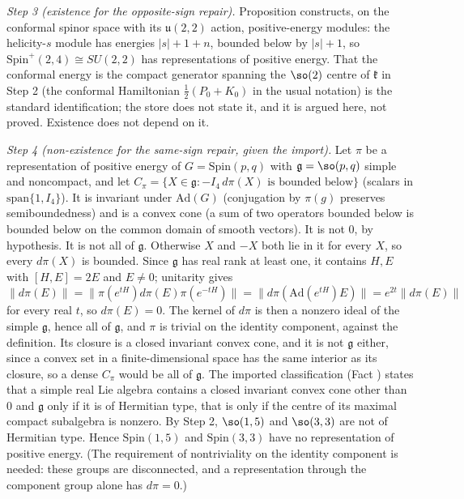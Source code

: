 \emph{Step 3 (existence for the opposite-sign repair).} Proposition  constructs, on the conformal spinor space with its $\mathfrak{u}(2,2)$ action, positive-energy modules: the helicity-$s$ module has energies $|s| + 1 + n$, bounded below by $|s| + 1$, so $\mathrm{Spin}^{+}(2,4) \cong SU(2,2)$ has representations of positive energy. That the conformal energy is the compact generator spanning the $\so(2)$ centre of $\mathfrak{k}$ in Step 2 (the conformal Hamiltonian $\tfrac12(P_{0} + K_{0})$ in the usual notation) is the standard identification; the store does not state it, and it is argued here, not proved. Existence does not depend on it.

\emph{Step 4 (non-existence for the same-sign repair, given the import).} Let $\pi$ be a representation of positive energy of $G = \mathrm{Spin}(p,q)$ with $\mathfrak{g} = \so(p,q)$ simple and noncompact, and let $C_{\pi} = \{X \in \mathfrak{g} : -I_{4}\,d\pi(X) \text{ is bounded below}\}$ (scalars in $\mathrm{span}\{1, I_{4}\}$). It is invariant under $\mathrm{Ad}(G)$ (conjugation by $\pi(g)$ preserves semiboundedness) and is a convex cone (a sum of two operators bounded below is bounded below on the common domain of smooth vectors). It is not $0$, by hypothesis. It is not all of $\mathfrak{g}$. Otherwise $X$ and $-X$ both lie in it for every $X$, so every $d\pi(X)$ is bounded. Since $\mathfrak{g}$ has real rank at least one, it contains $H, E$ with $[H, E] = 2E$ and $E \neq 0$; unitarity gives $\|d\pi(E)\| = \|\pi(e^{tH})d\pi(E)\pi(e^{-tH})\| = \|d\pi(\mathrm{Ad}(e^{tH})E)\| = e^{2t}\|d\pi(E)\|$ for every real $t$, so $d\pi(E) = 0$. The kernel of $d\pi$ is then a nonzero ideal of the simple $\mathfrak{g}$, hence all of $\mathfrak{g}$, and $\pi$ is trivial on the identity component, against the definition. Its closure is a closed invariant convex cone, and it is not $\mathfrak{g}$ either, since a convex set in a finite-dimensional space has the same interior as its closure, so a dense $C_{\pi}$ would be all of $\mathfrak{g}$. The imported classification (Fact ) states that a simple real Lie algebra contains a closed invariant convex cone other than $0$ and $\mathfrak{g}$ only if it is of Hermitian type, that is only if the centre of its maximal compact subalgebra is nonzero. By Step 2, $\so(1,5)$ and $\so(3,3)$ are not of Hermitian type. Hence $\mathrm{Spin}(1,5)$ and $\mathrm{Spin}(3,3)$ have no representation of positive energy. (The requirement of nontriviality on the identity component is needed: these groups are disconnected, and a representation through the component group alone has $d\pi = 0$.)

